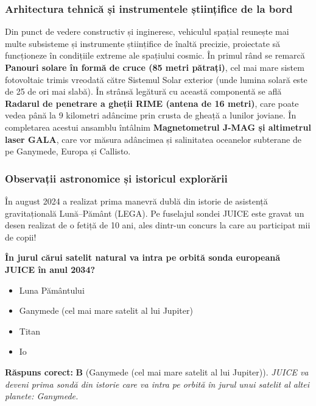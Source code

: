 \subsubsection*{Arhitectura tehnică și instrumentele științifice de la bord}
Din punct de vedere constructiv și ingineresc, vehiculul spațial reunește mai multe subsisteme și instrumente științifice de înaltă precizie, proiectate să funcționeze în condițiile extreme ale spațiului cosmic. În primul rând se remarcă \textbf{Panouri solare în formă de cruce (85 metri pătrați)}, cel mai mare sistem fotovoltaic trimis vreodată către Sistemul Solar exterior (unde lumina solară este de 25 de ori mai slabă). În strânsă legătură cu această componentă se află \textbf{Radarul de penetrare a gheții RIME (antena de 16 metri)}, care poate \guillemotleft{}vedea\guillemotright{} până la 9 kilometri adâncime prin crusta de gheață a lunilor joviane. În completarea acestui ansamblu întâlnim \textbf{Magnetometrul J-MAG și altimetrul laser GALA}, care vor măsura adâncimea și salinitatea oceanelor subterane de pe Ganymede, Europa și Callisto.

\subsubsection*{Observații astronomice și istoricul explorării}
În august 2024 a realizat prima manevră dublă din istorie de asistență gravitațională Lună--Pământ (LEGA). Pe fuselajul sondei JUICE este gravat un desen realizat de o fetiță de 10 ani, ales dintr-un concurs la care au participat mii de copii!

\vspace{6pt}
\begin{tcolorbox}[orbitarquiz, title={\textbf{Întrebare de verificare \#52: JUICE (Jupiter Icy Moons Explorer)}}]
\textbf{În jurul cărui satelit natural va intra pe orbită sonda europeană JUICE în anul 2034?}
\begin{itemize}[leftmargin=2.2em, itemsep=2pt, topsep=4pt]
  \item[$\square$ \textbf{A.}] Luna Pământului
  \item[$\square$ \textbf{B.}] Ganymede (cel mai mare satelit al lui Jupiter)
  \item[$\square$ \textbf{C.}] Titan
  \item[$\square$ \textbf{D.}] Io
\end{itemize}
\vspace{2pt}
{\footnotesize\color{orbitarMuted}\textbf{Răspuns corect:} \textbf{B} (Ganymede (cel mai mare satelit al lui Jupiter)). \emph{JUICE va deveni prima sondă din istorie care va intra pe orbită în jurul unui satelit al altei planete: Ganymede.}}
\end{tcolorbox}
\clearpage


